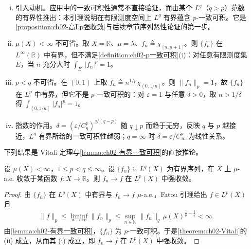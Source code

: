 \documentclass[../../main.tex]{subfiles}%
\begin{document}
\begin{remark}\label{remark:ch02-有界一致可积}
\begin{enumerate}[(i)]
\item 引入动机。应用中的一致可积性通常不直接验证，而由某个 $L^q$（$q>p$）范数的有界性推出：本引理说明在有限测度空间上 $L^q$ 有界蕴含 $p$-一致可积。它是\cref{proposition:ch02-高Lp强收敛}与后续章节序列紧性论证的第一步。
\item $\mu(X)<\infty$ 不可省。取 $X=\mathbb R$、$\mu=\lambda$、$f_n\triangleq\chi_{[n,n+1]}$。则 $\{f_n\}$ 在 $L^\infty(\mathbb R)$ 中有界，但不满足\cref{definition:ch02-p一致可积}(i)：对任意有限测度集 $E$，当 $n$ 充分大时 $\int_{E^c}|f_n|^p=1$。
\item $p<q$ 不可省。在 $(0,1)$ 上取 $f_n\triangleq n^{1/p}\chi_{(0,1/n)}$。则 $\|f_n\|_p=1$，故 $\{f_n\}$ 在 $L^p$ 中有界，但它不是 $p$-一致可积的：对 $\varepsilon=1$ 与任意 $\delta>0$，取 $n>1/\delta$ 得 $\int_{(0,1/n)}|f_n|^p=1$。
\item 指数的作用。$\delta=\left(\varepsilon/C_q^p\right)^{q/(q-p)}$ 随 $q\downarrow p$ 而趋于无穷，反映 $q$ 与 $p$ 越接近，$L^q$ 有界所给的一致可积性越弱；$q=\infty$ 时 $\delta=\varepsilon/C_\infty^p$ 为线性关系。
\end{enumerate}
\end{remark}

下列结果是 Vitali 定理与\cref{lemma:ch02-有界一致可积}的直接推论。

\begin{proposition}\label{proposition:ch02-高Lp强收敛}
设 $\mu(X)<\infty$，$1\leqslant p<q\leqslant\infty$。设 $\{f_n\}\subseteq L^q(X)$ 为有界序列，在 $X$ 上 $\mu$-a.e. 收敛于某函数 $f:X\to\mathbb R$。则 $f_n\to f$ 在 $L^p(X)$ 中强收敛。
\end{proposition}

\begin{proof}
由 $\{f_n\}$ 在 $L^q(X)$ 中有界与 $f_n\to f$ $\mu$-a.e.，Fatou 引理给出 $f\in L^p(X)$ 且
\begin{align*}
\|f\|_p\leqslant\liminf_{n\to\infty}\|f_n\|_p\leqslant\sup_{n\in\mathbb N}\|f_n\|_q\,\mu(X)^{\frac1p-\frac1q}<\infty.
\end{align*}
由\cref{lemma:ch02-有界一致可积}，$\{f_n\}$ 为 $p$-一致可积。于是\cref{theorem:ch02-Vitali}的 (ii) 成立，从而其 (i) 成立，即 $f_n\to f$ 在 $L^p(X)$ 中强收敛。
\end{proof}
\end{document}
